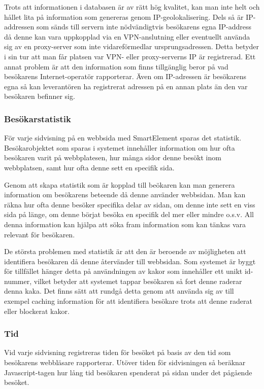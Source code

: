 Trots att informationen i databasen är av rätt hög kvalitet, kan man inte helt och hållet lita på information som genereras genom IP-geolokalisering. Dels så är IP-addressen som sänds till servern inte nödvändigtvis besökarens egna IP-address då denne kan vara uppkopplad via en VPN-anslutning eller eventuellt använda sig av en proxy-server som inte vidareförmedlar ursprungsadressen. Detta betyder i sin tur att man får platsen var VPN- eller proxy-serverns IP är registrerad. Ett annat problem är att den information som finns tillgänglig beror på vad besökarens Internet-operatör rapporterar. Även om IP-adressen är besökarens egna så kan leverantören ha registrerat adressen på en annan plats än den var besökaren befinner sig. 

\subsubsection{Besökarstatistik}

För varje sidvisning på en webbsida med SmartElement sparas det statistik. Besökarobjektet som sparas i systemet innehåller information om hur ofta besökaren varit på webbplatesen, hur många sidor denne besökt inom webbplatsen, samt hur ofta denne sett en specifik sida.

Genom att skapa statistik som är kopplad till beökaren kan man generera information om besökarens beteende då denne använder webbsidan. Man kan räkna hur ofta denne besöker specifika delar av sidan, om denne inte sett en viss sida på länge, om denne börjat besöka en specifik del mer eller mindre o.s.v. All denna information kan hjälpa att söka fram information som kan tänkas vara relevant för besökaren.

De största problemen med statistik är att den är beroende av möjligheten att identifiera besökaren då denne återvänder till webbsidan. Som systemet är byggt för tillfället hänger detta på användningen av kakor som innehåller ett unikt id-nummer, vilket betyder att systemet tappar besökaren så fort denne raderar denna kaka. Det finns sätt att rundgå detta genom att använda sig av till exempel caching information för att identifiera besökare trots att denne raderat eller blockerat kakor. \citep{ashkanblog}



\subsubsection{Tid}

Vid varje sidvisning registreras tiden för besöket på basis av den tid som besökarens webbläsare rapporterar. Utöver tiden för sidvisningen så beräknar Javascript-tagen hur lång tid besökaren spenderat på sidan under det pågående besöket.

